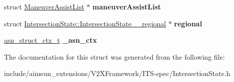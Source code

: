 \begin{DoxyCompactItemize}
\item 
struct \hyperlink{structManeuverAssistList}{Maneuver\+Assist\+List} $\ast$ {\bfseries maneuver\+Assist\+List}\hypertarget{structIntersectionState_ab75d665e2f9bbbf67e574291f5e97214}{}\label{structIntersectionState_ab75d665e2f9bbbf67e574291f5e97214}

\item 
struct \hyperlink{structIntersectionState_1_1IntersectionState____regional}{Intersection\+State\+::\+Intersection\+State\+\_\+\+\_\+regional} $\ast$ {\bfseries regional}\hypertarget{structIntersectionState_a81513181084b60f35d1791f64230c7d9}{}\label{structIntersectionState_a81513181084b60f35d1791f64230c7d9}

\item 
\hyperlink{structasn__struct__ctx__s}{asn\+\_\+struct\+\_\+ctx\+\_\+t} {\bfseries \+\_\+asn\+\_\+ctx}\hypertarget{structIntersectionState_a1e67fc390d2368d515c26dfc9c1ef02e}{}\label{structIntersectionState_a1e67fc390d2368d515c26dfc9c1ef02e}

\end{DoxyCompactItemize}


The documentation for this struct was generated from the following file\+:\begin{DoxyCompactItemize}
\item 
include/aimsun\+\_\+extensions/\+V2\+X\+Framework/\+I\+T\+S-\/spec/Intersection\+State.\+h\end{DoxyCompactItemize}
